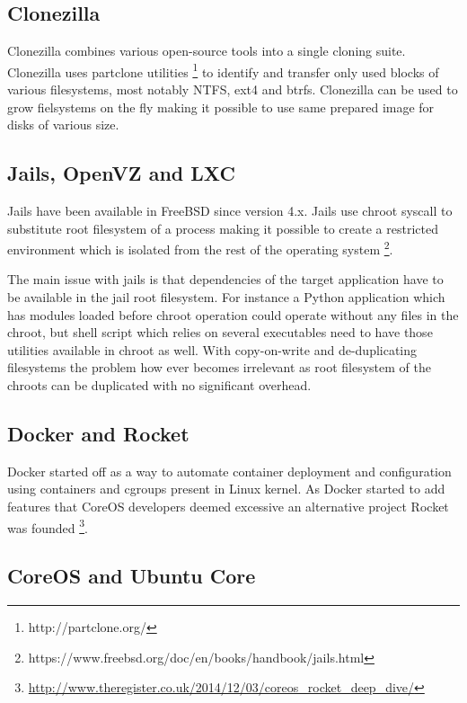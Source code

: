 \documentclass{article}
\begin{document}
\subsection{Clonezilla}

Clonezilla combines various open-source tools into a single cloning suite. Clonezilla uses partclone utilities  \footnote{http://partclone.org/} to identify and transfer only used blocks of various filesystems, most notably NTFS, ext4 and btrfs. Clonezilla can be used to grow fielsystems on the fly making it possible to use same prepared image for disks of various size. 

\subsection{Jails, OpenVZ and LXC}

Jails have been available in FreeBSD since version 4.x. Jails use chroot syscall to substitute root filesystem of a process making it possible to create a restricted environment which is isolated from the rest of the operating system \footnote{https://www.freebsd.org/doc/en/books/handbook/jails.html}.

The main issue with jails is that dependencies of the target application have to be available in the jail root filesystem. For instance a Python application which has modules loaded before chroot operation could operate without any files in the chroot, but shell script which relies on several executables need to have those utilities available in chroot as well. With copy-on-write and de-duplicating filesystems the problem how ever becomes irrelevant as root filesystem of the chroots can be duplicated with no significant overhead.


\subsection{Docker and Rocket}

Docker started off as a way to automate container deployment and configuration using containers and cgroups present in Linux kernel. As Docker started to add features that CoreOS developers deemed excessive an alternative project Rocket was founded \footnote{\url{http://www.theregister.co.uk/2014/12/03/coreos_rocket_deep_dive/}}.

\subsection{CoreOS and Ubuntu Core}
\end{document}
